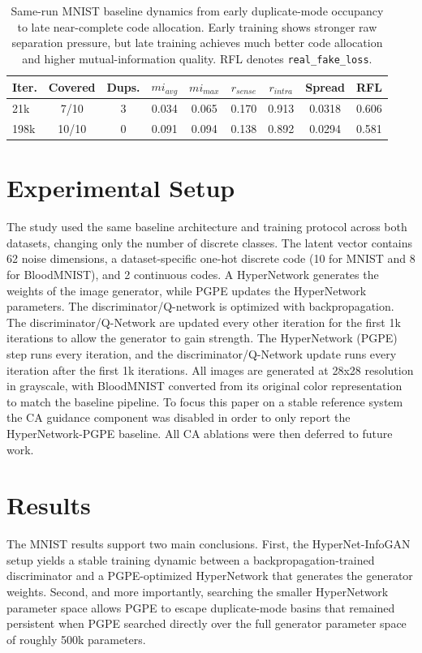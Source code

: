 \documentclass[letterpaper]{article} %
\begin{document}
	\begin{table}[t]
		\centering
		\caption{Same-run MNIST baseline dynamics from early duplicate-mode occupancy to late near-complete code allocation. Early training shows stronger raw separation pressure, but late training achieves much better code allocation and higher mutual-information quality. RFL denotes \texttt{real\_fake\_loss}.}
		\label{tab:mnist_baseline_progress_expanded}
		\begin{tabular}{lcccccccc}
			\toprule
			Iter. & Covered & Dups. & $mi_{avg}$ & $mi_{max}$ & $r_{sense}$ & $r_{intra}$ & Spread & RFL \\
			\midrule
			21k   & 7/10 & 3 & 0.034 & 0.065 & 0.170 & 0.913 & 0.0318 & 0.606 \\
			198k  & 10/10 & 0 & 0.091 & 0.094 & 0.138 & 0.892 & 0.0294 & 0.581 \\
			\bottomrule
		\end{tabular}
	\end{table}
	
	\section{Experimental Setup}
	The study used the same baseline architecture and training protocol across both datasets, changing only the number of discrete classes. The latent vector contains 62 noise dimensions, a dataset-specific one-hot discrete code (10 for MNIST and 8 for BloodMNIST), and 2 continuous codes. A HyperNetwork generates the weights of the image generator, while PGPE updates the HyperNetwork parameters. The discriminator/Q-network is optimized with backpropagation. The discriminator/Q-Network are updated every other iteration for the first 1k iterations to allow the generator to gain strength. The HyperNetwork (PGPE) step runs every iteration, and the discriminator/Q-Network update runs every iteration after the first 1k iterations. All images are generated at 28x28 resolution in grayscale, with BloodMNIST converted from its original color representation to match the baseline pipeline. To focus this paper on a stable reference system the CA guidance component was disabled in order to only report the HyperNetwork-PGPE baseline. All CA ablations were then deferred to future work.

	\section{Results}
	The MNIST results support two main conclusions. First, the HyperNet-InfoGAN setup yields a stable training dynamic between a backpropagation-trained discriminator and a PGPE-optimized HyperNetwork that generates the generator weights. Second, and more importantly, searching the smaller HyperNetwork parameter space allows PGPE to escape duplicate-mode basins that remained persistent when PGPE searched directly over the full generator parameter space of roughly 500k parameters.
\end{document}
